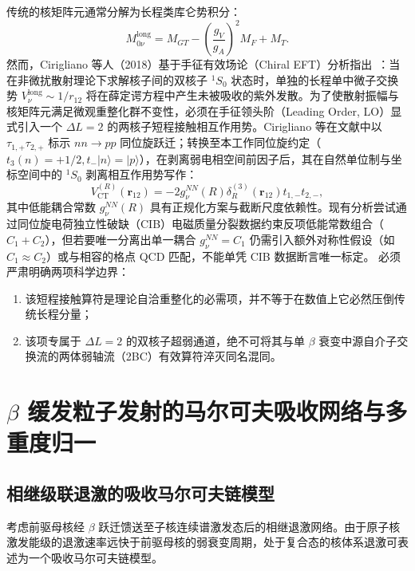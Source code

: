 传统的核矩阵元通常分解为长程类库仑势积分：
\begin{equation}\label{eq:appD-0nubb-long-range}
M_{0\nu}^{\mathrm{long}} = M_{GT} - \left(\frac{g_V}{g_A}\right)^2 M_F + M_T.
\end{equation}
然而，Cirigliano 等人（2018）基于手征有效场论（Chiral EFT）分析指出~\cite{cirigliano-2018-leading-short-range-double-beta}：当在非微扰散射理论下求解核子间的双核子 $^1S_0$ 状态时，单独的长程单中微子交换势 $V_\nu^{\mathrm{long}} \sim 1/r_{12}$ 将在薛定谔方程中产生未被吸收的紫外发散。为了使散射振幅与核矩阵元满足微观重整化群不变性，必须在手征领头阶（Leading Order, LO）显式引入一个 $\Delta L = 2$ 的两核子短程接触相互作用势。Cirigliano 等在文献中以 $\tau_{1,+} \tau_{2,+}$ 标示 $n n \to p p$ 同位旋跃迁；转换至本工作同位旋约定（$t_3(n) = +1/2, t_- |n\rangle = |p\rangle$），在剥离弱电相空间前因子后，其在自然单位制与坐标空间中的 $^1S_0$ 剥离相互作用势写作：
\begin{equation}\label{eq:appD-contact-potential}
V_{\mathrm{CT}}^{(R)}(\mathbf{r}_{12}) = -2 g_\nu^{NN}(R) \delta_R^{(3)}(\mathbf{r}_{12}) t_{1,-} t_{2,-},
\end{equation}
其中低能耦合常数 $g_\nu^{NN}(R)$ 具有正规化方案与截断尺度依赖性。现有分析尝试通过同位旋电荷独立性破缺（CIB）电磁质量分裂数据约束反项低能常数组合（$C_1 + C_2$），但若要唯一分离出单一耦合 $g_\nu^{NN} = C_1$ 仍需引入额外对称性假设（如 $C_1 \approx C_2$）或与相容的格点 QCD 匹配，不能单凭 CIB 数据断言唯一标定。
必须严肃明确两项科学边界：
\begin{enumerate}
\item 该短程接触算符是理论自洽重整化的必需项，并不等于在数值上它必然压倒传统长程分量；
\item 该项专属于 $\Delta L = 2$ 的双核子超弱通道，绝不可将其与单 $\beta$ 衰变中源自介子交换流的两体弱轴流（2BC）有效算符淬灭同名混同。
\end{enumerate}

\section{$\beta$ 缓发粒子发射的马尔可夫吸收网络与多重度归一}\label{sec:appD-delayed-neutron-network}

\subsection{相继级联退激的吸收马尔可夫链模型}

考虑前驱母核经 $\beta$ 跃迁馈送至子核连续谱激发态后的相继退激网络。由于原子核激发能级的退激速率远快于前驱母核的弱衰变周期，处于复合态的核体系退激可表述为一个吸收马尔可夫链模型。

